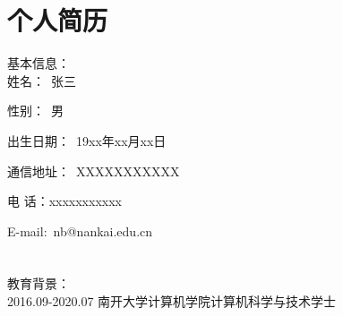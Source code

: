 

\chapter*{个人简历}

\noindent 基本信息：\\

 姓名：~张三

 性别：~男 

 出生日期：~19xx年xx月xx日

 通信地址：~XXXXXXXXXXX

 电  话：xxxxxxxxxxx

 E-mail:~nb@nankai.edu.cn \\ \\
\\
教育背景：\\  

2016.09-2020.07 \quad 南开大学\quad 计算机学院\quad\quad 计算机科学与技术\quad\quad 学士 \\ 
\\
